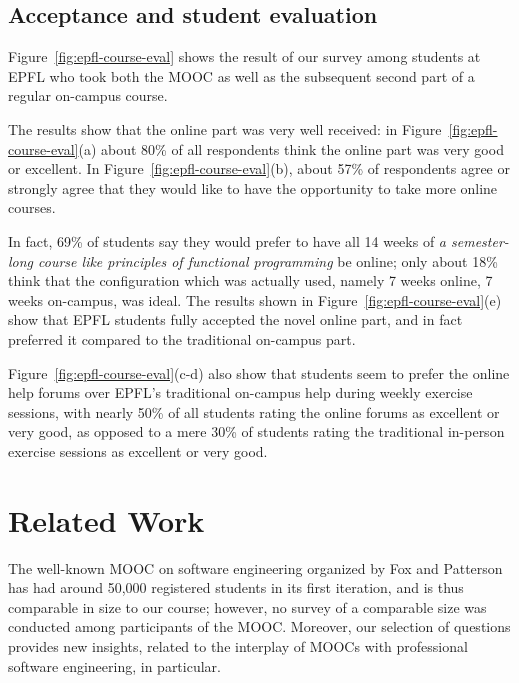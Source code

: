 \documentclass{sig-alternate}
\begin{document}
\subsection{Acceptance and student evaluation}

Figure~\ref{fig:epfl-course-eval} shows the result of our survey among
students at EPFL who took both the MOOC as well as the subsequent second part
of a regular on-campus course.

The results show that the online part was very
well received: in Figure~\ref{fig:epfl-course-eval}(a) about 80\% of all respondents
think the online part was very good or excellent.
In Figure~\ref{fig:epfl-course-eval}(b), about 57\% of respondents agree or strongly
agree that they would like to have the opportunity to take more online courses.

In fact, 69\% of students say they would prefer to
have all 14 weeks of {\em a semester-long course like principles of functional programming}
be online; only about 18\% think that the configuration which was actually used,
namely 7 weeks online, 7 weeks on-campus, was ideal. The results shown in
Figure~\ref{fig:epfl-course-eval}(e) show that EPFL students fully accepted the novel
online part, and in fact preferred it compared to the traditional on-campus part.

Figure~\ref{fig:epfl-course-eval}(c-d) also show that students seem to prefer the online
help forums over EPFL's traditional on-campus help during weekly exercise sessions, with
nearly 50\% of all students rating the online forums as excellent or very good, as opposed
to a mere 30\% of students rating the traditional in-person exercise sessions as excellent
or very good.

\section{Related Work}
\label{sec:related-work}

The well-known MOOC on software engineering organized by Fox and
Patterson~\cite{FoxP12} has had around 50,000 registered students in its first
iteration, and is thus comparable in size to our course; however, no survey of
a comparable size was conducted among participants of the MOOC. Moreover, our
selection of questions provides new insights, related to the interplay of
MOOCs with professional software engineering, in particular.
\end{document}
